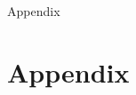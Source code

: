 \documentclass{beamer}
\begin{document}



\begin{frame}
	\begin{center}
    \LARGE{Appendix}
	\end{center}
\end{frame}

\section{Appendix}




\end{document}
